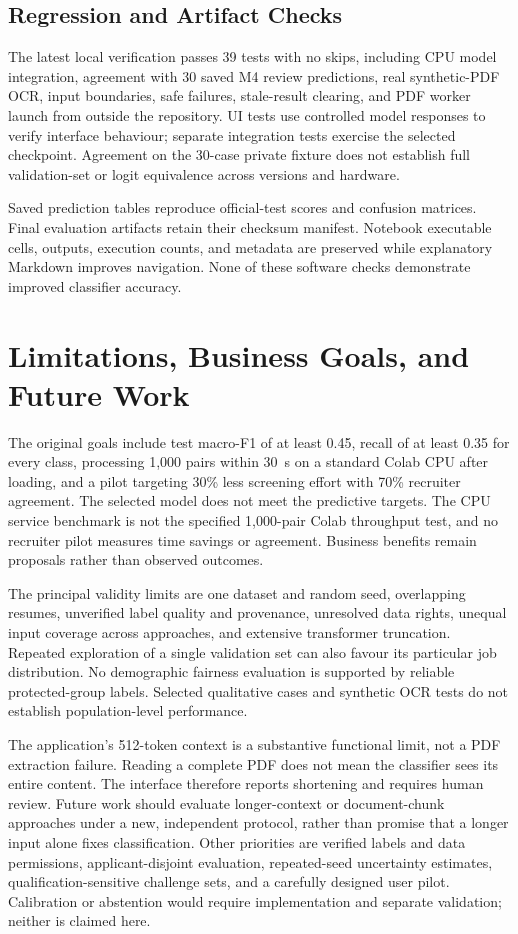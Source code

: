 \documentclass[conference,a4paper]{IEEEtran}
\begin{document}
\subsection{Regression and Artifact Checks}
The latest local verification passes 39 tests with no skips, including CPU model integration, agreement with 30 saved M4 review predictions, real synthetic-PDF OCR, input boundaries, safe failures, stale-result clearing, and PDF worker launch from outside the repository. UI tests use controlled model responses to verify interface behaviour; separate integration tests exercise the selected checkpoint. Agreement on the 30-case private fixture does not establish full validation-set or logit equivalence across versions and hardware.

Saved prediction tables reproduce official-test scores and confusion matrices. Final evaluation artifacts retain their checksum manifest. Notebook executable cells, outputs, execution counts, and metadata are preserved while explanatory Markdown improves navigation. None of these software checks demonstrate improved classifier accuracy.

\section{Limitations, Business Goals, and Future Work}
The original goals include test macro-F1 of at least 0.45, recall of at least 0.35 for every class, processing 1,000 pairs within 30~s on a standard Colab CPU after loading, and a pilot targeting 30\% less screening effort with 70\% recruiter agreement. The selected model does not meet the predictive targets. The CPU service benchmark is not the specified 1,000-pair Colab throughput test, and no recruiter pilot measures time savings or agreement. Business benefits remain proposals rather than observed outcomes.

The principal validity limits are one dataset and random seed, overlapping resumes, unverified label quality and provenance, unresolved data rights, unequal input coverage across approaches, and extensive transformer truncation. Repeated exploration of a single validation set can also favour its particular job distribution. No demographic fairness evaluation is supported by reliable protected-group labels. Selected qualitative cases and synthetic OCR tests do not establish population-level performance.

The application's 512-token context is a substantive functional limit, not a PDF extraction failure. Reading a complete PDF does not mean the classifier sees its entire content. The interface therefore reports shortening and requires human review. Future work should evaluate longer-context or document-chunk approaches under a new, independent protocol, rather than promise that a longer input alone fixes classification. Other priorities are verified labels and data permissions, applicant-disjoint evaluation, repeated-seed uncertainty estimates, qualification-sensitive challenge sets, and a carefully designed user pilot. Calibration or abstention would require implementation and separate validation; neither is claimed here.
\end{document}

